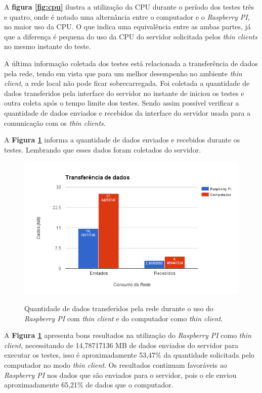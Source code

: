 \documentclass[
	12pt,				%
	openright,			%
	twoside,			%
	a4paper,			%
	chapter=TITLE,		%
	english,			%
	brazil				%
	]{abntex2}
\begin{document}
A \textbf{figura \ref{fig:cpu}} ilustra a utilização da CPU durante o período dos testes três e quatro, onde é notado uma alternância entre o computador e o \textit{Raspberry PI}, no maior uso da CPU. O que indica uma equivalência entre as ambas partes, já que a diferença é pequena do uso da CPU do servidor solicitada pelos \textit{thin clients}  no mesmo instante do teste.

A última informação coletada dos testes está relacionada a transferência de dados pela rede, tendo em vista que para um melhor desempenho no ambiente \textit{thin client}, a rede local não pode ficar sobrecarregada. Foi coletada a quantidade de dados transferidos pela interface do servidor no instante de iniciou os testes e outra coleta após o tempo limite dos testes. Sendo assim possível verificar a quantidade de dados enviados e recebidos da interface do servidor usada para a comunicação com os \textit{thin clients}.

A \textbf{Figura \ref{fig:net}} informa a quantidade de dados enviados e recebidos durante os testes. Lembrando que esses dados foram coletados do servidor.

\begin{figure}[!h]
\centering
\caption{Quantidade de dados transferidos pela rede durante o uso do \textit{Raspberry PI} com \textit{thin client} e do computador como \textit{thin client}.}
\includegraphics[scale=0.8]{Imagens/net}
\label{fig:net}
\end{figure}

\newpage
A \textbf{Figura \ref{fig:net}} apresenta bons resultados na utilização do \textit{Raspberry PI} como \textit{thin client}, necessitando de 14,78717136 MB de dados enviados do servidor para executar os testes, isso é aproximadamente 53,47\% da quantidade solicitada pelo computador no modo \textit{thin client}. Os resultados continuam favoráveis ao \textit{Raspberry PI} nos dados que são enviados para o servidor, pois o ele enviou aproximadamente 65,21\% de dados que o computador.
\end{document}
